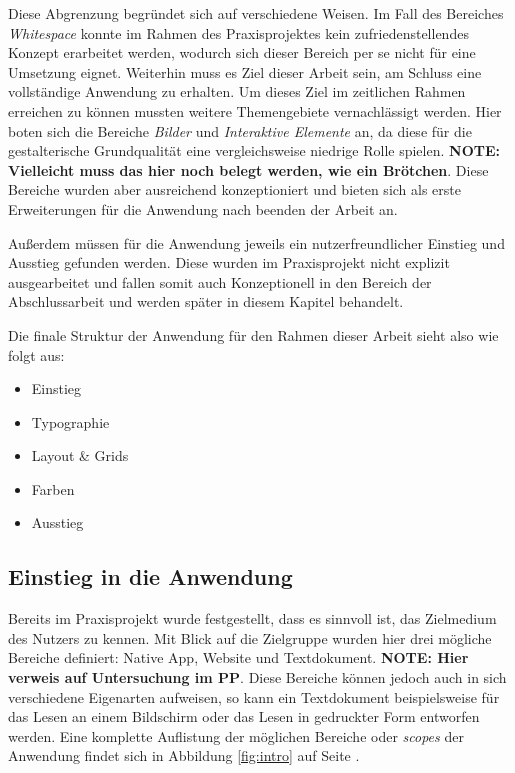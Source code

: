 Diese Abgrenzung begründet sich auf verschiedene Weisen. Im Fall des Bereiches \textit{Whitespace} konnte im Rahmen des Praxisprojektes kein zufriedenstellendes Konzept erarbeitet werden, wodurch sich dieser Bereich per se nicht für eine Umsetzung eignet. Weiterhin muss es Ziel dieser Arbeit sein, am Schluss eine vollständige Anwendung zu erhalten. Um dieses Ziel im zeitlichen Rahmen erreichen zu können mussten weitere Themengebiete vernachlässigt werden. Hier boten sich die Bereiche \textit{Bilder} und \textit{Interaktive Elemente} an, da diese für die gestalterische Grundqualität eine vergleichsweise niedrige Rolle spielen. \textbf{NOTE: Vielleicht muss das hier noch belegt werden, wie ein Brötchen}. Diese Bereiche wurden aber ausreichend konzeptioniert und bieten sich als erste Erweiterungen für die Anwendung nach beenden der Arbeit an.

Außerdem müssen für die Anwendung jeweils ein nutzerfreundlicher Einstieg und Ausstieg gefunden werden. Diese wurden im Praxisprojekt nicht explizit ausgearbeitet und fallen somit auch Konzeptionell in den Bereich der Abschlussarbeit und werden später in diesem Kapitel behandelt.

Die finale Struktur der Anwendung für den Rahmen dieser Arbeit sieht also wie folgt aus:

\begin{itemize}
  \item Einstieg
  \item Typographie
  \item Layout \& Grids
  \item Farben
  \item Ausstieg
\end{itemize}

\subsection{Einstieg in die Anwendung}
Bereits im Praxisprojekt wurde festgestellt, dass es sinnvoll ist, das Zielmedium des Nutzers zu kennen. Mit Blick auf die Zielgruppe wurden hier drei mögliche Bereiche definiert: Native App, Website und Textdokument. \textbf{NOTE: Hier verweis auf Untersuchung im PP}. Diese Bereiche können jedoch auch in sich verschiedene Eigenarten aufweisen, so kann ein Textdokument beispielsweise für das Lesen an einem Bildschirm oder das Lesen in gedruckter Form entworfen werden. Eine komplette Auflistung der möglichen Bereiche oder \textit{scopes} der Anwendung findet sich in Abbildung \ref{fig:intro} auf Seite \pageref{fig:intro}.

